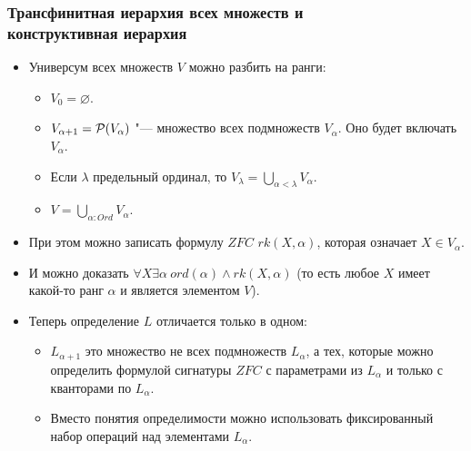 \documentclass[10pt]{beamer}
\begin{document}
\begin{frame}
    \frametitle{Трансфинитная иерархия всех множеств и \\ конструктивная иерархия}
    \begin{itemize}
        \item Универсум всех множеств $V$ можно разбить на ранги:
        \begin{itemize}
            \item $V_0 = \varnothing$.
            \item $V_{\alpha+1} = \mathcal{P}({V_\alpha})$ "--- множество всех подмножеств $V_\alpha$. Оно будет включать $V_\alpha$.
            \item Если $\lambda$ предельный ординал, то $V_\lambda = \bigcup_{\alpha < \lambda} V_\alpha$.
            \item $V = \bigcup_{\alpha : Ord} V_\alpha$.
        \end{itemize}
        \item При этом можно записать формулу $ZFC$ $rk(X, \alpha)$, которая означает $X \in V_\alpha$.
        \item И можно доказать $\forall X \exists \alpha~ord(\alpha) \land rk(X, \alpha)$ (то есть любое $X$ имеет какой-то ранг $\alpha$ и является элементом $V$).
        \pause
        \item Теперь определение $L$ отличается только в одном:
        \begin{itemize}
            \item $L_{\alpha+1}$ это множество не всех подмножеств $L_\alpha$, а тех, которые можно определить формулой сигнатуры $ZFC$ с параметрами из $L_\alpha$ и только с кванторами по $L_\alpha$.
            \item Вместо понятия определимости можно использовать фиксированный набор операций над элементами $L_\alpha$.
        \end{itemize}
    \end{itemize}
\end{frame}
\end{document}
